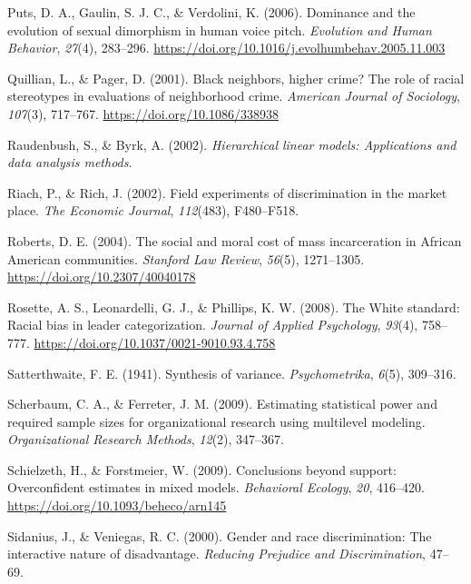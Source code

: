 \documentclass[
  english,
  man]{apa6}
\begin{document}
\leavevmode\hypertarget{ref-Puts2006}{}%
Puts, D. A., Gaulin, S. J. C., \& Verdolini, K. (2006). Dominance and the evolution of sexual dimorphism in human voice pitch. \emph{Evolution and Human Behavior}, \emph{27}(4), 283--296. \url{https://doi.org/10.1016/j.evolhumbehav.2005.11.003}

\leavevmode\hypertarget{ref-Quillian2001}{}%
Quillian, L., \& Pager, D. (2001). Black neighbors, higher crime? The role of racial stereotypes in evaluations of neighborhood crime. \emph{American Journal of Sociology}, \emph{107}(3), 717--767. \url{https://doi.org/10.1086/338938}

\leavevmode\hypertarget{ref-Raudenbush2002}{}%
Raudenbush, S., \& Byrk, A. (2002). \emph{Hierarchical linear models: Applications and data analysis methods}.

\leavevmode\hypertarget{ref-Riach2002}{}%
Riach, P., \& Rich, J. (2002). Field experiments of discrimination in the market place. \emph{The Economic Journal}, \emph{112}(483), F480--F518.

\leavevmode\hypertarget{ref-Roberts2004}{}%
Roberts, D. E. (2004). The social and moral cost of mass incarceration in African American communities. \emph{Stanford Law Review}, \emph{56}(5), 1271--1305. \url{https://doi.org/10.2307/40040178}

\leavevmode\hypertarget{ref-Rosette2008}{}%
Rosette, A. S., Leonardelli, G. J., \& Phillips, K. W. (2008). The White standard: Racial bias in leader categorization. \emph{Journal of Applied Psychology}, \emph{93}(4), 758--777. \url{https://doi.org/10.1037/0021-9010.93.4.758}

\leavevmode\hypertarget{ref-Satterthwaite1941}{}%
Satterthwaite, F. E. (1941). Synthesis of variance. \emph{Psychometrika}, \emph{6}(5), 309--316.

\leavevmode\hypertarget{ref-Scherbaum2009}{}%
Scherbaum, C. A., \& Ferreter, J. M. (2009). Estimating statistical power and required sample sizes for organizational research using multilevel modeling. \emph{Organizational Research Methods}, \emph{12}(2), 347--367.

\leavevmode\hypertarget{ref-Schielzeth2009}{}%
Schielzeth, H., \& Forstmeier, W. (2009). Conclusions beyond support: Overconfident estimates in mixed models. \emph{Behavioral Ecology}, \emph{20}, 416--420. \url{https://doi.org/10.1093/beheco/arn145}

\leavevmode\hypertarget{ref-Sidanius2000}{}%
Sidanius, J., \& Veniegas, R. C. (2000). Gender and race discrimination: The interactive nature of disadvantage. \emph{Reducing Prejudice and Discrimination}, 47--69.
\end{document}
